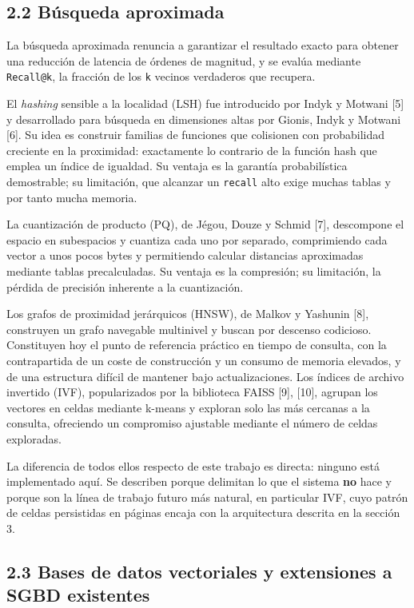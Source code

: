 \documentclass[11pt,a4paper]{article}
\let\pandocsubsection\subsection
\let\subsection\section
\let\subsubsection\pandocsubsection
\begin{document}
\subsubsection{2.2 Búsqueda aproximada}\label{22-buxfasqueda-aproximada}

La búsqueda aproximada renuncia a garantizar el resultado exacto para
obtener una reducción de latencia de órdenes de magnitud, y se evalúa
mediante \texttt{Recall@k}, la fracción de los \texttt{k} vecinos
verdaderos que recupera.

El \emph{hashing} sensible a la localidad (LSH) fue introducido por
Indyk y Motwani {[}5{]} y desarrollado para búsqueda en dimensiones
altas por Gionis, Indyk y Motwani {[}6{]}. Su idea es construir familias
de funciones que colisionen con probabilidad creciente en la proximidad:
exactamente lo contrario de la función hash que emplea un índice de
igualdad. Su ventaja es la garantía probabilística demostrable; su
limitación, que alcanzar un \texttt{recall} alto exige muchas tablas y
por tanto mucha memoria.

La cuantización de producto (PQ), de Jégou, Douze y Schmid {[}7{]},
descompone el espacio en subespacios y cuantiza cada uno por separado,
comprimiendo cada vector a unos pocos bytes y permitiendo calcular
distancias aproximadas mediante tablas precalculadas. Su ventaja es la
compresión; su limitación, la pérdida de precisión inherente a la
cuantización.

Los grafos de proximidad jerárquicos (HNSW), de Malkov y Yashunin
{[}8{]}, construyen un grafo navegable multinivel y buscan por descenso
codicioso. Constituyen hoy el punto de referencia práctico en tiempo de
consulta, con la contrapartida de un coste de construcción y un consumo
de memoria elevados, y de una estructura difícil de mantener bajo
actualizaciones. Los índices de archivo invertido (IVF), popularizados
por la biblioteca FAISS {[}9{]}, {[}10{]}, agrupan los vectores en
celdas mediante k-means y exploran solo las más cercanas a la consulta,
ofreciendo un compromiso ajustable mediante el número de celdas
exploradas.

La diferencia de todos ellos respecto de este trabajo es directa:
ninguno está implementado aquí. Se describen porque delimitan lo que el
sistema \textbf{no} hace y porque son la línea de trabajo futuro más
natural, en particular IVF, cuyo patrón de celdas persistidas en páginas
encaja con la arquitectura descrita en la sección 3.

\subsubsection{2.3 Bases de datos vectoriales y extensiones a SGBD
existentes}\label{23-bases-de-datos-vectoriales-y-extensiones-a-sgbd-existentes}
\end{document}
